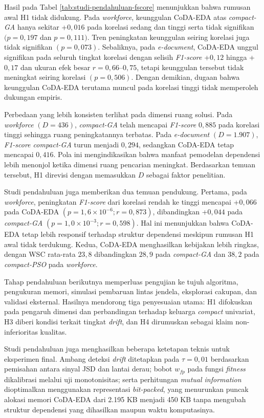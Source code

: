 Hasil pada Tabel \ref{tab:studi-pendahuluan-fscore} menunjukkan bahwa rumusan awal H1 tidak didukung. 
Pada \textit{workforce}, keunggulan CoDA-EDA atas \textit{compact-GA} hanya sekitar +$0{,}016$ pada korelasi sedang dan tinggi serta tidak signifikan $(p=0{,}197$ dan $p=0{,}111)$. 
Tren peningkatan keunggulan seiring korelasi juga tidak signifikan $(p=0{,}073)$. 
Sebaliknya, pada \textit{e-document}, CoDA-EDA unggul signifikan pada seluruh tingkat korelasi dengan selisih \textit{F1-score} +$0{,}12$ hingga +$0{,}17$ dan ukuran efek besar $r=0{,}66$–$0,75$, tetapi keunggulan tersebut tidak meningkat seiring korelasi $(p=0{,}506)$. 
Dengan demikian, dugaan bahwa keunggulan CoDA-EDA terutama muncul pada korelasi tinggi tidak memperoleh dukungan empiris.

Perbedaan yang lebih konsisten terlihat pada dimensi ruang solusi. 
Pada \textit{workforce} $(D=436)$, \textit{compact-GA} telah mencapai \textit{F1-score} $0,885$ pada korelasi tinggi sehingga ruang peningkatannya terbatas. 
Pada \textit{e-document} $(D=1.907)$, \textit{F1-score compact-GA} turun menjadi $0,294$, sedangkan CoDA-EDA tetap mencapai $0,416$. 
Pola ini mengindikasikan bahwa manfaat pemodelan dependensi lebih menonjol ketika dimensi ruang pencarian meningkat. 
Berdasarkan temuan tersebut, H1 direvisi dengan memasukkan $D$ sebagai faktor penelitian.

Studi pendahuluan juga memberikan dua temuan pendukung. 
Pertama, pada \textit{workforce}, peningkatan \textit{F1-score} dari korelasi rendah ke tinggi mencapai +$0{,}066$ pada CoDA-EDA $(p=1{,}6\times10^{-6}; r=0{,}873)$, dibandingkan +$0{,}044$ pada \textit{compact-GA} $(p=1{,}0\times10^{-3}; r=0{,}598)$. 
Hal ini menunjukkan bahwa CoDA-EDA tetap lebih responsif terhadap struktur dependensi meskipun rumusan H1 awal tidak terdukung. 
Kedua, CoDA-EDA menghasilkan kebijakan lebih ringkas, dengan WSC rata-rata $23,8$ dibandingkan $28,9$ pada \textit{compact-GA} dan $38,2$ pada \textit{compact-PSO} pada \textit{workforce}.

Tahap pendahuluan berikutnya memperluas pengujian ke tujuh algoritma, pengukuran memori, simulasi pembaruan lintas jendela, eksplorasi cakupan, dan validasi eksternal. 
Hasilnya mendorong tiga penyesuaian utama: H1 difokuskan pada pengaruh dimensi dan perbandingan terhadap keluarga \textit{compact} univariat, H3 diberi kondisi terkait tingkat \textit{drift}, dan H4 dirumuskan sebagai klaim non-inferioritas kualitas.

Studi pendahuluan juga menghasilkan beberapa ketetapan teknis untuk eksperimen final. 
Ambang deteksi \textit{drift} ditetapkan pada $\tau=0{,}01$ berdasarkan pemisahan antara sinyal JSD dan lantai derau; bobot $w_{fp}$ pada fungsi \textit{fitness} dikalibrasi melalui uji monotonisitas; serta perhitungan \textit{mutual information} dioptimalkan menggunakan representasi \textit{bit-packed}, yang menurunkan puncak alokasi memori CoDA-EDA dari 2.195 KB menjadi 450 KB tanpa mengubah struktur dependensi yang dihasilkan maupun waktu komputasinya.